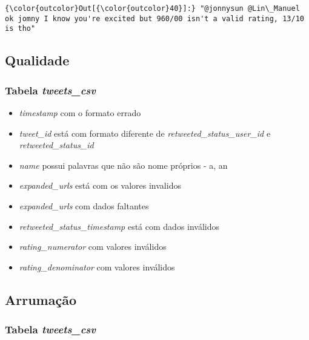 \documentclass[11pt]{article}
\providecommand{\tightlist}{%
      \setlength{\itemsep}{0pt}\setlength{\parskip}{0pt}}
\begin{document}
\begin{Verbatim}[commandchars=\\\{\}]
{\color{outcolor}Out[{\color{outcolor}40}]:} "@jonnysun @Lin\_Manuel ok jomny I know you're excited but 960/00 isn't a valid rating, 13/10 is tho"
\end{Verbatim}
            
    \hypertarget{qualidade}{%
\subsection{Qualidade}\label{qualidade}}

\hypertarget{tabela-tweets_csv}{%
\subsubsection{\texorpdfstring{Tabela
\emph{tweets\_csv}}{Tabela tweets\_csv}}\label{tabela-tweets_csv}}

\begin{itemize}
\tightlist
\item
  \emph{timestamp} com o formato errado
\item
  \emph{tweet\_id} está com formato diferente de
  \emph{retweeted\_status\_user\_id} e \emph{retweeted\_status\_id}
\item
  \emph{name} possui palavras que não são nome próprios - a, an
\item
  \emph{expanded\_urls} está com os valores invalidos
\item
  \emph{expanded\_urls} com dados faltantes
\item
  \emph{retweeted\_status\_timestamp} está com dados inválidos
\item
  \emph{rating\_numerator} com valores inválidos
\item
  \emph{rating\_denominator} com valores inválidos
\end{itemize}

\hypertarget{arrumauxe7uxe3o}{%
\subsection{Arrumação}\label{arrumauxe7uxe3o}}

\hypertarget{tabela-tweets_csv-1}{%
\subsubsection{\texorpdfstring{Tabela
\emph{tweets\_csv}}{Tabela tweets\_csv}}\label{tabela-tweets_csv-1}}
\end{document}

